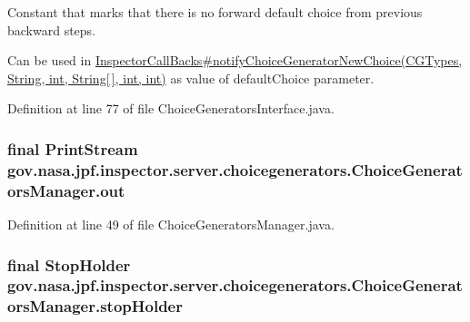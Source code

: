 Constant that marks that there is no forward default choice from previous backward steps. 

Can be used in \hyperlink{}{Inspector\+Call\+Backs\#notify\+Choice\+Generator\+New\+Choice(\+C\+G\+Types, String, int, String\mbox{[}$\,$\mbox{]}, int, int)} as value of default\+Choice parameter. 

Definition at line 77 of file Choice\+Generators\+Interface.\+java.

\subsubsection[{\texorpdfstring{out}{out}}]{\setlength{\rightskip}{0pt plus 5cm}final Print\+Stream gov.\+nasa.\+jpf.\+inspector.\+server.\+choicegenerators.\+Choice\+Generators\+Manager.\+out\hspace{0.3cm}{\ttfamily [private]}}\hypertarget{classgov_1_1nasa_1_1jpf_1_1inspector_1_1server_1_1choicegenerators_1_1_choice_generators_manager_a6fb73457e2b6a476ce657a0c51f936a6}{}\label{classgov_1_1nasa_1_1jpf_1_1inspector_1_1server_1_1choicegenerators_1_1_choice_generators_manager_a6fb73457e2b6a476ce657a0c51f936a6}


Definition at line 49 of file Choice\+Generators\+Manager.\+java.

\subsubsection[{\texorpdfstring{stop\+Holder}{stopHolder}}]{\setlength{\rightskip}{0pt plus 5cm}final {\bf Stop\+Holder} gov.\+nasa.\+jpf.\+inspector.\+server.\+choicegenerators.\+Choice\+Generators\+Manager.\+stop\+Holder\hspace{0.3cm}{\ttfamily [private]}}\hypertarget{classgov_1_1nasa_1_1jpf_1_1inspector_1_1server_1_1choicegenerators_1_1_choice_generators_manager_af24775b2d725979fea9639be757ea85a}{}\label{classgov_1_1nasa_1_1jpf_1_1inspector_1_1server_1_1choicegenerators_1_1_choice_generators_manager_af24775b2d725979fea9639be757ea85a}


